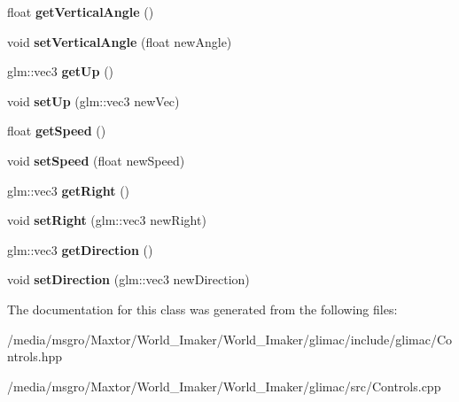 \begin{DoxyCompactItemize}
float {\bfseries get\+Vertical\+Angle} ()
\item 
\mbox{\label{classglimac_1_1Controls_a83626414d05716552bfe4a919ea0ff5c}} 
void {\bfseries set\+Vertical\+Angle} (float new\+Angle)
\item 
\mbox{\label{classglimac_1_1Controls_a6d030431b293ace529d7696c2444fd68}} 
glm\+::vec3 {\bfseries get\+Up} ()
\item 
\mbox{\label{classglimac_1_1Controls_aa9d4839c153b46efa419af8599d07d7b}} 
void {\bfseries set\+Up} (glm\+::vec3 new\+Vec)
\item 
\mbox{\label{classglimac_1_1Controls_aac3ad087d701019eede9beb547fe7425}} 
float {\bfseries get\+Speed} ()
\item 
\mbox{\label{classglimac_1_1Controls_abdd360d577810fddb2f01a96dc5baacc}} 
void {\bfseries set\+Speed} (float new\+Speed)
\item 
\mbox{\label{classglimac_1_1Controls_a65b6d95a26fab1a0fba7b3e0dfbf7178}} 
glm\+::vec3 {\bfseries get\+Right} ()
\item 
\mbox{\label{classglimac_1_1Controls_ae42a699a28d327cd7c9e1d01e78ae693}} 
void {\bfseries set\+Right} (glm\+::vec3 new\+Right)
\item 
\mbox{\label{classglimac_1_1Controls_acb5245c5972c2d065f693e6899b805f6}} 
glm\+::vec3 {\bfseries get\+Direction} ()
\item 
\mbox{\label{classglimac_1_1Controls_aeecf9a01133bdfa844e6282437601a00}} 
void {\bfseries set\+Direction} (glm\+::vec3 new\+Direction)
\end{DoxyCompactItemize}


The documentation for this class was generated from the following files\+:\begin{DoxyCompactItemize}
\item 
/media/msgro/\+Maxtor/\+World\+\_\+\+Imaker/\+World\+\_\+\+Imaker/glimac/include/glimac/Controls.\+hpp\item 
/media/msgro/\+Maxtor/\+World\+\_\+\+Imaker/\+World\+\_\+\+Imaker/glimac/src/Controls.\+cpp\end{DoxyCompactItemize}
